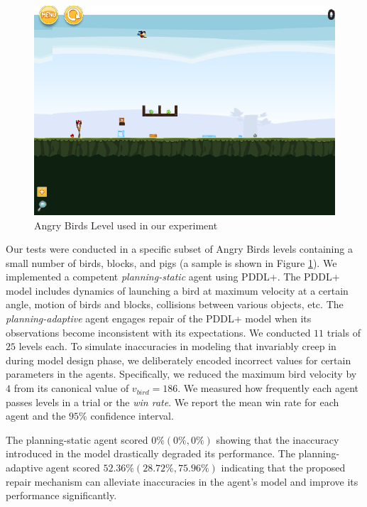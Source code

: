 \documentclass[letterpaper]{article} %
\begin{document}
\begin{figure}
    \centering
    \includegraphics[width=0.9\columnwidth]{figures/sb_level.png}
    \caption{Angry Birds Level used in our experiment}
    \label{fig:ab_level}
\end{figure}


Our tests were conducted in a specific subset of Angry Birds levels containing a small number of birds, blocks, and pigs (a sample is shown in Figure \ref{fig:ab_level}). We implemented a competent \emph{planning-static} agent using PDDL+. The PDDL+ model includes dynamics of launching a bird at maximum velocity at a certain angle, motion of birds and blocks, collisions between various objects, etc. The \emph{planning-adaptive} agent engages repair of the PDDL+ model when its observations become inconsistent with its expectations. We conducted $11$ trials of $25$ levels each. To simulate inaccuracies in modeling that invariably creep in during model design phase, we deliberately encoded incorrect values for certain parameters in the agents. Specifically, we reduced the maximum bird velocity by $4$ from its canonical value of $v_{bird}=186$. We measured how frequently each agent passes levels in a trial or the \emph{win rate}. 
We report the mean win rate for each agent and the $95\%$ confidence interval. 

The planning-static agent scored $0\% (0\%, 0\%)$ showing that the inaccuracy introduced in the model drastically degraded its performance. The planning-adaptive agent scored $52.36\% (28.72\%, 75.96\%)$ indicating that the proposed repair mechanism can alleviate inaccuracies in the agent's model and improve its performance significantly.
\end{document}
